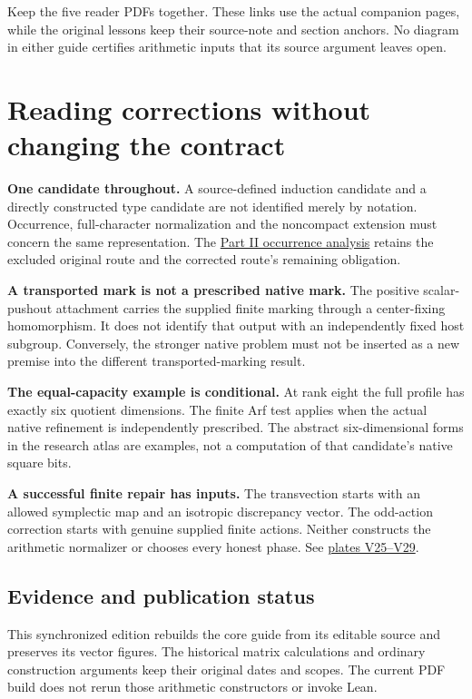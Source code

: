 Keep the five reader PDFs together. These links use the actual companion pages, while the original lessons keep their source-note and section anchors. No diagram in either guide certifies arithmetic inputs that its source argument leaves open.
\clearpage
\section*{Reading corrections without changing the contract}
{}
\textbf{One candidate throughout.} A source-defined induction candidate and a directly constructed type candidate are not identified merely by notation. Occurrence, full-character normalization and the noncompact extension must concern the same representation. The \href{https://komorebi.invalid/b06/visual_occurrence}{Part II occurrence analysis} retains the excluded original route and the corrected route's remaining obligation.

\textbf{A transported mark is not a prescribed native mark.} The positive scalar-pushout attachment carries the supplied finite marking through a center-fixing homomorphism. It does not identify that output with an independently fixed host subgroup. Conversely, the stronger native problem must not be inserted as a new premise into the different transported-marking result.

\textbf{The equal-capacity example is conditional.} At rank eight the full profile has exactly six quotient dimensions. The finite Arf test applies when the actual native refinement is independently prescribed. The abstract six-dimensional forms in the research atlas are examples, not a computation of that candidate's native square bits.

\textbf{A successful finite repair has inputs.} The transvection starts with an allowed symplectic map and an isotropic discrepancy vector. The odd-action correction starts with genuine supplied finite actions. Neither constructs the arithmetic normalizer or chooses every honest phase. See \href{https://komorebi.invalid/b06/visual_repairs}{plates V25--V29}.

\subsection*{Evidence and publication status}
This synchronized edition rebuilds the core guide from its editable source and preserves its vector figures. The historical matrix calculations and ordinary construction arguments keep their original dates and scopes. The current PDF build does not rerun those arithmetic constructors or invoke Lean.

